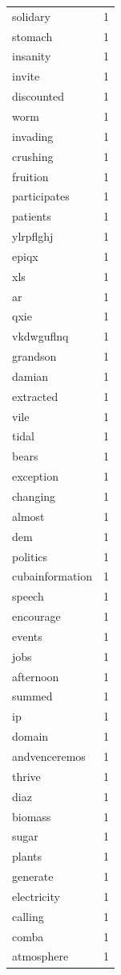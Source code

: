 \begin{tabular}{lr}
solidary & 1 \\
stomach & 1 \\
insanity & 1 \\
invite & 1 \\
discounted & 1 \\
worm & 1 \\
invading & 1 \\
crushing & 1 \\
fruition & 1 \\
participates & 1 \\
patients & 1 \\
ylrpflghj & 1 \\
epiqx & 1 \\
xls & 1 \\
ar & 1 \\
qxie & 1 \\
vkdwguflnq & 1 \\
grandson & 1 \\
damian & 1 \\
extracted & 1 \\
vile & 1 \\
tidal & 1 \\
bears & 1 \\
exception & 1 \\
changing & 1 \\
almost & 1 \\
dem & 1 \\
politics & 1 \\
cubainformation & 1 \\
speech & 1 \\
encourage & 1 \\
events & 1 \\
jobs & 1 \\
afternoon & 1 \\
summed & 1 \\
ip & 1 \\
domain & 1 \\
andvenceremos & 1 \\
thrive & 1 \\
diaz & 1 \\
biomass & 1 \\
sugar & 1 \\
plants & 1 \\
generate & 1 \\
electricity & 1 \\
calling & 1 \\
comba & 1 \\
atmosphere & 1 \\

\end{tabular}
